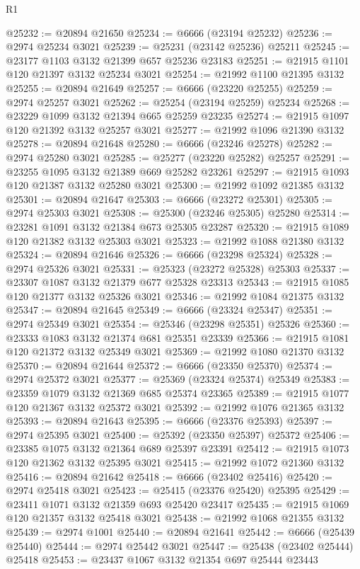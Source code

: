\begin{lexlean}{R1}
\begin{coremodule}
@25232 := @20894 @21650
@25234 := @6666 (@23194 @25232)
@25236 := @2974 @25234 @3021
@25239 := @25231 (@23142 @25236) @25211
@25245 := @23177 @1103 @3132 @21399 @657 @25236 @23183
@25251 := @21915 @1101 @120 @21397 @3132 @25234 @3021
@25254 := @21992 @1100 @21395 @3132
@25255 := @20894 @21649
@25257 := @6666 (@23220 @25255)
@25259 := @2974 @25257 @3021
@25262 := @25254 (@23194 @25259) @25234
@25268 := @23229 @1099 @3132 @21394 @665 @25259 @23235
@25274 := @21915 @1097 @120 @21392 @3132 @25257 @3021
@25277 := @21992 @1096 @21390 @3132
@25278 := @20894 @21648
@25280 := @6666 (@23246 @25278)
@25282 := @2974 @25280 @3021
@25285 := @25277 (@23220 @25282) @25257
@25291 := @23255 @1095 @3132 @21389 @669 @25282 @23261
@25297 := @21915 @1093 @120 @21387 @3132 @25280 @3021
@25300 := @21992 @1092 @21385 @3132
@25301 := @20894 @21647
@25303 := @6666 (@23272 @25301)
@25305 := @2974 @25303 @3021
@25308 := @25300 (@23246 @25305) @25280
@25314 := @23281 @1091 @3132 @21384 @673 @25305 @23287
@25320 := @21915 @1089 @120 @21382 @3132 @25303 @3021
@25323 := @21992 @1088 @21380 @3132
@25324 := @20894 @21646
@25326 := @6666 (@23298 @25324)
@25328 := @2974 @25326 @3021
@25331 := @25323 (@23272 @25328) @25303
@25337 := @23307 @1087 @3132 @21379 @677 @25328 @23313
@25343 := @21915 @1085 @120 @21377 @3132 @25326 @3021
@25346 := @21992 @1084 @21375 @3132
@25347 := @20894 @21645
@25349 := @6666 (@23324 @25347)
@25351 := @2974 @25349 @3021
@25354 := @25346 (@23298 @25351) @25326
@25360 := @23333 @1083 @3132 @21374 @681 @25351 @23339
@25366 := @21915 @1081 @120 @21372 @3132 @25349 @3021
@25369 := @21992 @1080 @21370 @3132
@25370 := @20894 @21644
@25372 := @6666 (@23350 @25370)
@25374 := @2974 @25372 @3021
@25377 := @25369 (@23324 @25374) @25349
@25383 := @23359 @1079 @3132 @21369 @685 @25374 @23365
@25389 := @21915 @1077 @120 @21367 @3132 @25372 @3021
@25392 := @21992 @1076 @21365 @3132
@25393 := @20894 @21643
@25395 := @6666 (@23376 @25393)
@25397 := @2974 @25395 @3021
@25400 := @25392 (@23350 @25397) @25372
@25406 := @23385 @1075 @3132 @21364 @689 @25397 @23391
@25412 := @21915 @1073 @120 @21362 @3132 @25395 @3021
@25415 := @21992 @1072 @21360 @3132
@25416 := @20894 @21642
@25418 := @6666 (@23402 @25416)
@25420 := @2974 @25418 @3021
@25423 := @25415 (@23376 @25420) @25395
@25429 := @23411 @1071 @3132 @21359 @693 @25420 @23417
@25435 := @21915 @1069 @120 @21357 @3132 @25418 @3021
@25438 := @21992 @1068 @21355 @3132
@25439 := @2974 @1001
@25440 := @20894 @21641
@25442 := @6666 (@25439 @25440)
@25444 := @2974 @25442 @3021
@25447 := @25438 (@23402 @25444) @25418
@25453 := @23437 @1067 @3132 @21354 @697 @25444 @23443

\end{coremodule}
\end{lexlean}
